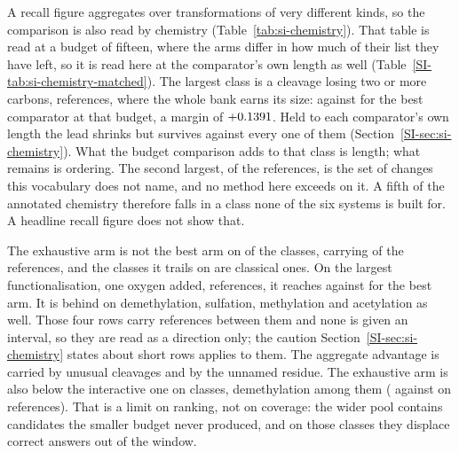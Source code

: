 A recall figure aggregates over transformations of very different kinds, so the comparison is also
read by chemistry (Table~\ref{tab:si-chemistry}). That table is read at a budget of fifteen,
where the arms differ in how much of their list they have left, so it is read here at the
comparator's own length as well (Table~\ref{SI-tab:si-chemistry-matched}). The largest class is a
cleavage losing two or more carbons, \numChemCleavageRefs{} references, where the whole bank earns
its size: \numChemCleavageBank{} against \numChemCleavageBestother{} for the best comparator at
that budget, a margin of $+0.1391$. Held to each comparator's own length the lead shrinks but survives against every one of them (Section~\ref{SI-sec:si-chemistry}). What
the budget comparison adds to that class is length; what remains is ordering. The second largest, \numChemOtherRefs{} of the \numChemReferences{} references, is the set of
changes this vocabulary does not name, and no method here exceeds \numChemOtherBest{} on it. A fifth of the annotated chemistry
therefore falls in a class none of the six systems is built for. A headline recall figure does not show that.

The exhaustive arm is not the best arm on \numChemBehind{} of the \numChemClasses{} classes,
carrying \numChemBehindrefs{} of the \numChemReferences{} references, and the classes it trails on
are classical ones. On the largest functionalisation, one oxygen added, \numChemOxygenrefs{}
references, it reaches \numChemOxygenbank{} against \numChemOxygenbest{} for the best arm. It is
behind on demethylation, sulfation, methylation and acetylation as well. Those four rows carry
\numChemSmallrowsrefs{} references between them and none is given an interval, so they are read
as a direction only; the caution
Section~\ref{SI-sec:si-chemistry} states about short rows applies to them. The aggregate advantage
is carried by unusual cleavages and by the unnamed residue. The exhaustive arm is also below the
interactive one on \numChemIntahead{} classes, demethylation among them
(\numChemDemethbank{} against \numChemDemethinter{} on \numChemDemethrefs{} references). That is
a limit on ranking, not on coverage: the wider pool contains candidates the smaller budget never
produced, and on those classes they displace correct answers out of the window.

